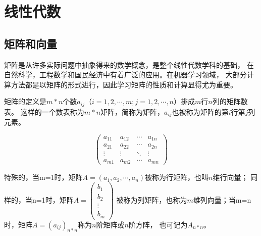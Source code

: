 \chapter{线性代数}
\label{chap:linear_algebra}
\section{矩阵和向量}

矩阵是从许多实际问题中抽象得来的数学概念，是整个线性代数学科的基础，
在自然科学，工程数学和国民经济中有着广泛的应用。在机器学习领域，
大部分计算方法都是以矩阵的形式进行，因此学习矩阵的性质和计算显得尤为重要。

矩阵的定义是$m*n$个数$a_{ij}$（$i=1,2,\cdots,m;j=1,2,\cdots,n$）排成$m$行$n$列的矩阵数表。
这样的一个数表称为$m*n$矩阵，简称为矩阵，$a_{ij}$也被称为矩阵的第$i$行第$j$列元素。

\begin{equation}
	\left( \begin{matrix}
    a_{11} & a_{12} & \cdots & a_{1n}\\
    a_{21} & a_{22} & \cdots & a_{2n}\\
    \vdots & \vdots & \ddots & \vdots\\
    a_{m1} & a_{m2} & \cdots & a_{mn}
\end{matrix}
\right )
\end{equation}

特殊的，当m=1时，矩阵$A=(a_{1},a_{2},\cdots,a_{n})$被称为行矩阵，也叫$n$维行向量；
同样的，当n=1时，矩阵$A=\left( \begin{array}{ccc}{b_1} \\{b_2}\\\vdots\\{b_m}\end{array}\right)$
被称为列矩阵，也称为$m$维列向量；当m=n时，矩阵$A=(a_{ij})_{n*n}$称为$n$阶矩阵或$n$阶方阵，
也可记为$A_{n*n}$。

